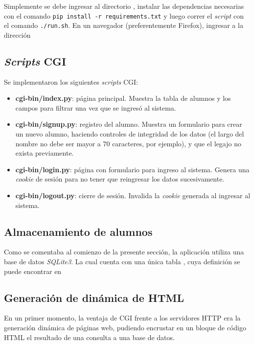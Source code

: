 Simplemente se debe ingresar al directorio , instalar las dependencias necesarias con el comando \texttt{pip install -r requirements.txt} y luego correr el \emph{script}  con el comando \texttt{./run.sh}. En un navegador (preferentemente Firefox), ingresar a la dirección 

\subsection{\emph{Scripts} CGI}

Se implementaron los siguientes \emph{scripts} CGI:

\begin{itemize}
    \item \textbf{cgi-bin/index.py}: página principal. Muestra la tabla de alumnos y los campos para filtrar una vez que se ingresó al sistema.
    \item \textbf{cgi-bin/signup.py}: registro del alumno. Muestra un formulario para crear un nuevo alumno, haciendo controles de integridad de los datos (el largo del nombre no debe ser mayor a 70 caracteres, por ejemplo), y que el legajo no exista previamente.
    \item \textbf{cgi-bin/login.py}: página con formulario para ingreso al sistema. Genera una \emph{cookie} de sesión para no tener que reingresar los datos sucesivamente. 
    \item \textbf{cgi-bin/logout.py}: cierre de sesión. Invalida la \emph{cookie} generada al ingresar al sistema.
\end{itemize}

\subsection{Almacenamiento de alumnos}

Como se comentaba al comienzo de la presente sección, la aplicación utiliza una base de datos \emph{SQLite3}. La cual cuenta con una única tabla , cuya definición se puede encontrar en 

\subsection{Generación de dinámica de HTML}

En un primer momento, la ventaja de CGI frente a los servidores HTTP era la generación dinámica de páginas web, pudiendo encrustar en un bloque de código HTML el resultado de una consulta a una base de datos.

